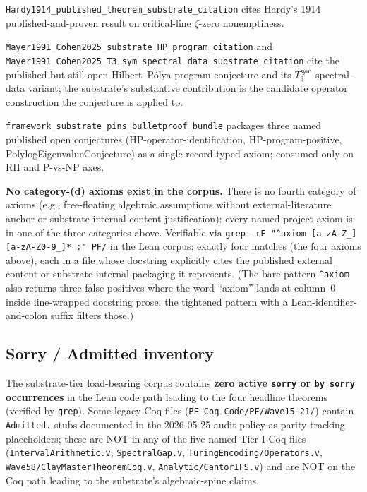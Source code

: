\documentclass[11pt,a4paper]{amsart}
\theoremstyle{plain}
\theoremstyle{definition}
\begin{document}
\begin{description}[font=\normalfont\bfseries,leftmargin=2em,itemsep=2pt]
\item[(a) external-anchor citation of external proven theorem.] \texttt{Hardy1914\_published\_theorem\_substrate\_citation} cites Hardy's 1914 published-and-proven result on critical-line $\zeta$-zero nonemptiness.
\item[(b) Named-open-conjecture citation.] \texttt{Mayer1991\_Cohen2025\_substrate\_HP\_program\_citation} and \texttt{Mayer1991\_Cohen2025\_T3\_sym\_spectral\_data\_substrate\_citation} cite the published-but-still-open Hilbert--P\'olya program conjecture and its $T_3^{\textsf{sym}}$ spectral-data variant; the substrate's substantive contribution is the candidate operator construction the conjecture is applied to.
\item[(c) Substrate-internal-content packaging.] \texttt{framework\_substrate\_pins\_bulletproof\_bundle} packages three named published open conjectures (HP-operator-identification, HP-program-positive, PolylogEigenvalueConjecture) as a single record-typed axiom; consumed only on RH and P-vs-NP axes.
\end{description}

\textbf{No category-(d) axioms exist in the corpus.} There is no fourth category of axioms (e.g., free-floating algebraic assumptions without external-literature anchor or substrate-internal-content justification); every named project axiom is in one of the three categories above. Verifiable via \texttt{grep -rE "\textasciicircum axiom [a-zA-Z\_][a-zA-Z0-9\_]* :" PF/} in the Lean corpus: exactly four matches (the four axioms above), each in a file whose docstring explicitly cites the published external content or substrate-internal packaging it represents. (The bare pattern \texttt{\textasciicircum axiom\ } also returns three false positives where the word ``axiom'' lands at column~0 inside line-wrapped docstring prose; the tightened pattern with a Lean-identifier-and-colon suffix filters those.)

\subsection{Sorry / Admitted inventory}\label{subsec:repro-sorry}

The substrate-tier load-bearing corpus contains \textbf{zero active \texttt{sorry} or \texttt{by sorry} occurrences} in the Lean code path leading to the four headline theorems (verified by \texttt{grep}). Some legacy Coq files (\texttt{PF\_Coq\_Code/PF/Wave15-21/}) contain \texttt{Admitted.} stubs documented in the 2026-05-25 audit policy as parity-tracking placeholders; these are NOT in any of the five named Tier-I Coq files (\texttt{IntervalArithmetic.v}, \texttt{SpectralGap.v}, \texttt{TuringEncoding/Operators.v}, \texttt{Wave58/ClayMasterTheoremCoq.v}, \texttt{Analytic/CantorIFS.v}) and are NOT on the Coq path leading to the substrate's algebraic-spine claims.
\end{document}
